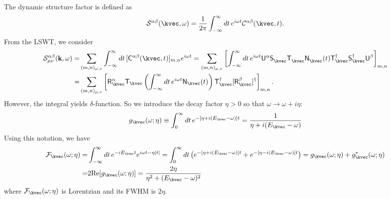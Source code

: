 The dynamic structure factor is defined as 
\begin{equation}
    \mathcal{S}^{\alpha\beta}(\kvec, \omega) 
    = \frac{1}{2\pi} \int_{-\infty}^{\infty} d t \, e^{i \omega t} \mathcal{C}^{\alpha\beta} (\kvec, t).
\end{equation}
From the LSWT, we consider 
\begin{align*}
    \mathcal{S}^{\alpha\beta}_{\mu\nu} (\mathbf{k}, \omega) 
    = & \sum_{(m,n)_{\mu,\nu}} \int_{-\infty}^{\infty} dt \, [\mathsf{C}^{\alpha\beta} (\kvec, t)]_{m,n} e^{i \omega t}
    = \sum_{(m,n)_{\mu,\nu}} 
    \left[ 
    \int_{-\infty}^{\infty} dt \, e^{i \omega t} 
    \mathsf{U}^{\alpha} 
    \mathsf{S}_{\kvec}^{\phantom \dagger} 
    \mathsf{T}_{\kvec}^{\phantom \dagger} 
    \mathsf{N}_{\kvec}^{\phantom \dagger}  (t)
    \mathsf{T}_{\kvec}^{         \dagger}
    \mathsf{S}_{\kvec}^{         \dagger}
    \mathsf{U}^{\beta}
    \right]_{m,n}  \\
    = & \sum_{(m,n)_{\mu,\nu}} 
    \left[  \mathsf{R}^{\alpha}_{\kvec} \mathsf{T}_{\kvec}
    \left( \int_{-\infty}^{\infty} dt \, e^{i \omega t} \mathsf{N}_{\kvec} (t) \right)
    \mathsf{T}_{\kvec}^{\dagger} [\mathsf{R}^{\beta}_{\kvec}]^{\dagger} \right]_{m,n}.
\end{align*}
However, the integral yields $\delta$-function. So we introduce the decay factor $\eta > 0$ so that $\omega \rightarrow \omega + i \eta$:
\begin{equation}
    g_{\kvec} ( \omega ; \eta ) 
    \equiv \int_{0}^{\infty} dt \, e^{ - [ \eta  + i( E_{\kvec} - \omega ) ] t} 
    = \frac{1}{\eta + i ( E_{\kvec} - \omega )}
\end{equation}
Using this notation, we have
\begin{align}
    \mathcal{F}_{\kvec} (\omega; \eta) = & \int_{-\infty}^{\infty} dt\, e^{-i E_{\kvec} t} e^{ i\omega t - \eta |t|} 
    =  \int_{0}^{\infty} dt \, 
    \big( e^{ - [ \eta  + i( E_{\kvec} - \omega ) ] t} + e^{ - [ \eta  - i( E_{\kvec} - \omega ) ] t} \big) 
    =  g_{\kvec} ( \omega ; \eta ) + g_{\kvec}^{*} ( \omega ; \eta ) \\
    = & 2 \mathrm{Re} [ g_{\kvec} ( \omega ; \eta ) ]
    = \frac{2\eta}{\eta^{2} + ( E_{\kvec} - \omega )^{2}}
\end{align}
where $\mathcal{F}_{\kvec}(\omega; \eta)$ is Lorentzian and its FWHM is $2\eta$.
